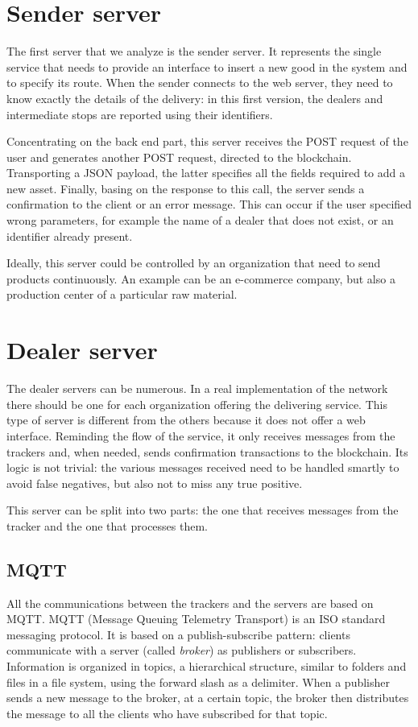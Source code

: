 \section{Sender server}
The first server that we analyze is the sender server. It represents the single service that needs to provide an interface to insert a new good in the system and to specify its route. When the sender connects to the web server, they need to know exactly the details of the delivery: in this first version, the dealers and intermediate stops are reported using their identifiers.

Concentrating on the back end part, this server receives the POST request of the user and generates another POST request, directed to the blockchain. Transporting a JSON payload, the latter specifies all the fields required to add a new asset. Finally, basing on the response to this call, the server sends a confirmation to the client or an error message. This can occur if the user specified wrong parameters, for example the name of a dealer that does not exist, or an identifier already present. 

Ideally, this server could be controlled by an organization that need to send products continuously. An example can be an e-commerce company, but also a production center of a particular raw material.

\section{Dealer server}
The dealer servers can be numerous. In a real implementation of the network there should be one for each organization offering the delivering service. This type of server is different from the others because it does not offer a web interface. Reminding the flow of the service, it only receives messages from the trackers and, when needed, sends confirmation transactions to the blockchain. Its logic is not trivial: the various messages received need to be handled smartly to avoid false negatives, but also not to miss any true positive.

This server can be split into two parts: the one that receives messages from the tracker and the one that processes them.

\subsection{MQTT}
All the communications between the trackers and the servers are based on MQTT. MQTT (Message Queuing Telemetry Transport) is an ISO standard messaging protocol. It is based on a publish-subscribe pattern: clients communicate with a server (called \emph{broker}) as publishers or subscribers. Information is organized in topics, a hierarchical structure, similar to folders and files in a file system, using the forward slash as a delimiter. When a publisher sends a new message to the broker, at a certain topic, the broker then distributes the message to all the clients who have subscribed for that topic.

